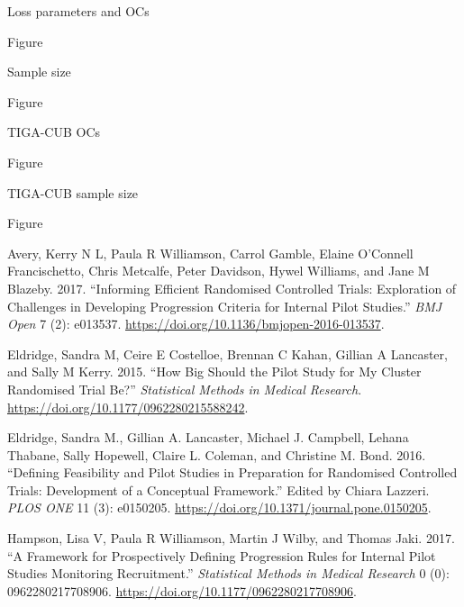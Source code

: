 \documentclass[
  ignorenonframetext,
]{beamer}
\begin{document}
\begin{frame}{Loss parameters and OCs}
\protect\hypertarget{loss-parameters-and-ocs}{}

Figure

\end{frame}

\begin{frame}{Sample size}
\protect\hypertarget{sample-size}{}

Figure

\end{frame}

\begin{frame}{TIGA-CUB OCs}
\protect\hypertarget{tiga-cub-ocs}{}

Figure

\end{frame}

\begin{frame}{TIGA-CUB sample size}
\protect\hypertarget{tiga-cub-sample-size}{}

Figure

\hypertarget{refs}{}
\leavevmode\hypertarget{ref-Avery2017}{}%
Avery, Kerry N L, Paula R Williamson, Carrol Gamble, Elaine O'Connell
Francischetto, Chris Metcalfe, Peter Davidson, Hywel Williams, and Jane
M Blazeby. 2017. ``Informing Efficient Randomised Controlled Trials:
Exploration of Challenges in Developing Progression Criteria for
Internal Pilot Studies.'' \emph{BMJ Open} 7 (2): e013537.
\url{https://doi.org/10.1136/bmjopen-2016-013537}.

\leavevmode\hypertarget{ref-Eldridge2015}{}%
Eldridge, Sandra M, Ceire E Costelloe, Brennan C Kahan, Gillian A
Lancaster, and Sally M Kerry. 2015. ``How Big Should the Pilot Study for
My Cluster Randomised Trial Be?'' \emph{Statistical Methods in Medical
Research}. \url{https://doi.org/10.1177/0962280215588242}.

\leavevmode\hypertarget{ref-Eldridge2016}{}%
Eldridge, Sandra M., Gillian A. Lancaster, Michael J. Campbell, Lehana
Thabane, Sally Hopewell, Claire L. Coleman, and Christine M. Bond. 2016.
``Defining Feasibility and Pilot Studies in Preparation for Randomised
Controlled Trials: Development of a Conceptual Framework.'' Edited by
Chiara Lazzeri. \emph{PLOS ONE} 11 (3): e0150205.
\url{https://doi.org/10.1371/journal.pone.0150205}.

\leavevmode\hypertarget{ref-Hampson2017}{}%
Hampson, Lisa V, Paula R Williamson, Martin J Wilby, and Thomas Jaki.
2017. ``A Framework for Prospectively Defining Progression Rules for
Internal Pilot Studies Monitoring Recruitment.'' \emph{Statistical
Methods in Medical Research} 0 (0): 0962280217708906.
\url{https://doi.org/10.1177/0962280217708906}.

\end{frame}
\end{document}
